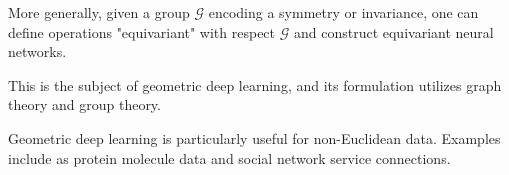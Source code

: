 \begin{concept}
    More generally, given a group $\mathcal{G}$ encoding a symmetry or invariance, one can define operations "equivariant" with respect $\mathcal{G}$ and construct equivariant neural networks.

    This is the subject of geometric deep learning, and its formulation utilizes graph theory and group theory.

    Geometric deep learning is particularly useful for non-Euclidean data. Examples include as protein molecule data and social network service connections.
\end{concept}

